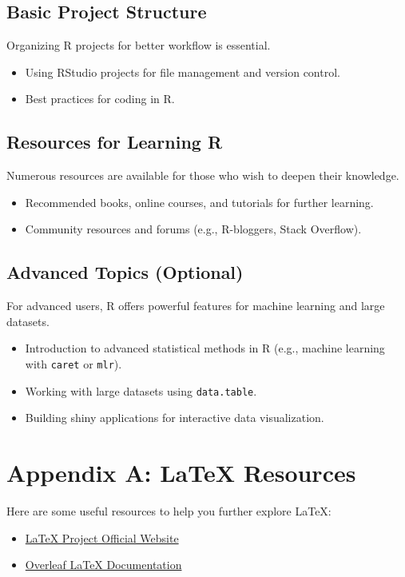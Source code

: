 \documentclass[12pt]{book}
\begin{document}
\section{Basic Project Structure}
Organizing R projects for better workflow is essential.
\begin{itemize}
    \item Using RStudio projects for file management and version control.
    \item Best practices for coding in R.
\end{itemize}

\section{Resources for Learning R}
Numerous resources are available for those who wish to deepen their knowledge.
\begin{itemize}
    \item Recommended books, online courses, and tutorials for further learning.
    \item Community resources and forums (e.g., R-bloggers, Stack Overflow).
\end{itemize}

\section{Advanced Topics (Optional)}
For advanced users, R offers powerful features for machine learning and large datasets.
\begin{itemize}
    \item Introduction to advanced statistical methods in R (e.g., machine learning with \texttt{caret} or \texttt{mlr}).
    \item Working with large datasets using \texttt{data.table}.
    \item Building shiny applications for interactive data visualization.
\end{itemize}



\appendix
\chapter{Appendix A: LaTeX Resources}
Here are some useful resources to help you further explore LaTeX:

\begin{itemize}
    \item \href{https://www.latex-project.org/}{LaTeX Project Official Website}
    \item \href{https://www.overleaf.com/learn}{Overleaf LaTeX Documentation}
\end{itemize}
\end{document}
